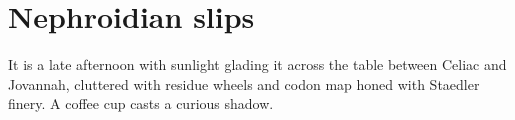 % 
% 
% 
% 
% 
% 
% 
% 
% 
% 
% 
% 
\section*{Nephroidian slips}

It is a late afternoon with sunlight glading it across the table between Celiac and Jovannah, cluttered with residue wheels and codon map honed with Staedler finery. A coffee cup casts a curious shadow.


